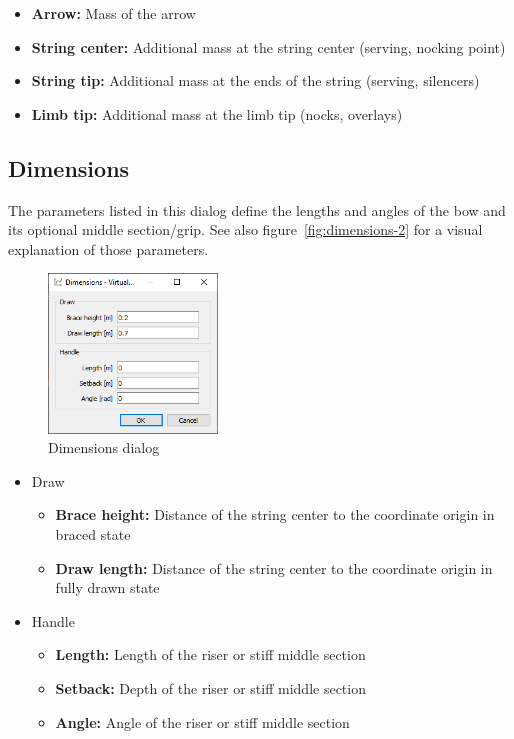 \documentclass[12pt]{article}
\begin{document}
\begin{itemize}
\item \textbf{Arrow:} Mass of the arrow
\item \textbf{String center:} Additional mass at the string center (serving, nocking point)
\item \textbf{String tip:} Additional mass at the ends of the string (serving, silencers)
\item \textbf{Limb tip:} Additional mass at the limb tip (nocks, overlays)
\end{itemize}

\subsection{Dimensions}

The parameters listed in this dialog define the lengths and angles of the bow and its optional middle section/grip. See also figure~\ref{fig:dimensions-2} for a visual explanation of those parameters.


\begin{figure}[H]
\centering
\includegraphics[width=0.4\textwidth]{figures/screenshots/input/dimensions}
\caption{Dimensions dialog}
\label{fig:dimensions-1}
\end{figure}

\newpage
\begin{itemize}
\item{Draw}
\begin{itemize}
\item \textbf{Brace height:} Distance of the string center to the coordinate origin in braced state
\item \textbf{Draw length:} Distance of the string center to the coordinate origin in fully drawn state
\end{itemize}
\item{Handle}
\begin{itemize}
\item \textbf{Length:} Length of the riser or stiff middle section
\item \textbf{Setback:} Depth of the riser or stiff middle section
\item \textbf{Angle:} Angle of the riser or stiff middle section
\end{itemize}
\end{itemize}
\end{document}
